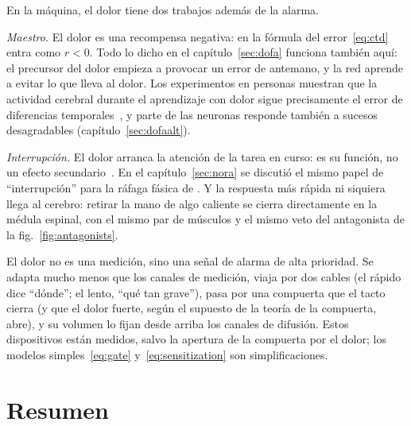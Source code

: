 En la máquina, el dolor tiene dos trabajos además de la alarma.

\emph{Maestro.} El dolor es una recompensa negativa: en la fórmula del error~\eqref{eq:ctd} entra como $r<0$. Todo lo dicho en el capítulo~\ref{sec:dofa} funciona también aquí: el precursor del dolor empieza a provocar un error de antemano, y la red aprende a evitar lo que lleva al dolor. Los experimentos en personas muestran que la actividad cerebral durante el aprendizaje con dolor sigue precisamente el error de diferencias temporales~\cite{Seymour2004}, y parte de las neuronas  responde también a sucesos desagradables (capítulo~\ref{sec:dofaalt}).

\emph{Interrupción.} El dolor arranca la atención de la tarea en curso: es su función, no un efecto secundario~\cite{EcclestonCrombez1999}. En el capítulo~\ref{sec:nora} se discutió el mismo papel de “interrupción” para la ráfaga fásica de . Y la respuesta más rápida ni siquiera llega al cerebro: retirar la mano de algo caliente se cierra directamente en la médula espinal, con el mismo par de músculos y el mismo veto del antagonista de la fig.~\ref{fig:antagonists}.

\begin{keyblock}
\begin{proposition}
\label{prop:pain}
El dolor no es una medición, sino una señal de alarma de alta prioridad. Se adapta mucho menos que los canales de medición, viaja por dos cables (el rápido dice “dónde”; el lento, “qué tan grave”), pasa por una compuerta que el tacto cierra (y que el dolor fuerte, según el supuesto de la teoría de la compuerta, abre), y su volumen lo fijan desde arriba los canales de difusión. Estos dispositivos están medidos, salvo la apertura de la compuerta por el dolor; los modelos simples~\eqref{eq:gate} y~\eqref{eq:sensitization} son simplificaciones.
\end{proposition}
\end{keyblock}

\section{Resumen}

